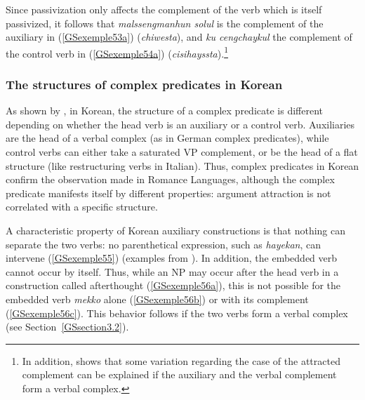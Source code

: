 \documentclass[output=paper
                ,modfonts
                ,nonflat
	        ,collection
	        ,collectionchapter
	        ,collectiontoclongg
 	        ,biblatex
                ,babelshorthands
                ,newtxmath
                ,draftmode
                ,colorlinks, citecolor=brown
]{./langsci/langscibook}
\begin{document}
{\eal
	\label{GSexemple54} 
	\label{GSexemple54a}
		
	\label{GSexemple54b}
\zl

Since passivization only affects the complement of the verb which is itself passivized, it follows that \emph{malssengmanhun solul} is the complement of the auxiliary in (\ref{GSexemple53a}) (\emph{chiwesta}), and \emph{ku cengchaykul} the complement of the control verb in (\ref{GSexemple54a}) (\emph{cisihayssta}).\footnote{In addition, \cite{Yoo2003} shows that some variation regarding the case of the attracted complement can be explained if the auxiliary and the verbal complement form a verbal complex.}

\subsubsection{The structures of complex predicates in Korean}\label{GSsection4.2.2}
 
As shown by \cite{Chung98a-u}, in Korean, the structure of a complex predicate is different depending on whether the head verb is an auxiliary or a control verb. Auxiliaries are the head of a verbal complex (as in German complex predicates), while control verbs can either take a saturated VP complement, or be the head of a flat structure (like restructuring verbs in Italian). Thus, complex predicates in Korean confirm the observation made in Romance Languages, although the complex predicate manifests itself by different properties: argument attraction is not correlated with a specific structure. 

A characteristic property of Korean auxiliary constructions is that nothing can separate the two verbs: no parenthetical expression, such as \emph{hayekan}, can intervene (\ref{GSexemple55}) (examples from \citealt{Chung98a-u}). In addition, the embedded verb cannot occur by itself. Thus, while an NP may occur after the head verb in a construction called afterthought (\ref{GSexemple56a}), this is not possible for the embedded verb \emph{mekko} alone (\ref{GSexemple56b}) or with its complement (\ref{GSexemple56c}). This behavior follows if the two verbs form a verbal complex (see Section~\ref{GSsection3.2}).

}
\end{document}
